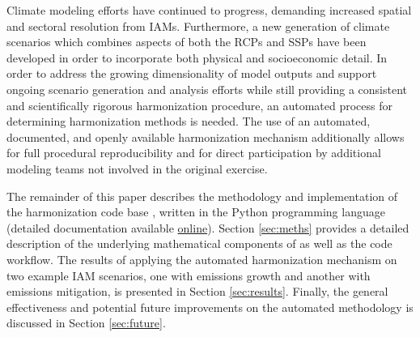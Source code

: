 Climate modeling efforts have continued to progress, demanding increased spatial
and sectoral resolution from IAMs. Furthermore, a new generation of climate
scenarios which combines aspects of both the RCPs and SSPs have been developed
in order to incorporate both physical and socioeconomic detail. In order to
address the growing dimensionality of model outputs and support ongoing scenario
generation and analysis efforts while still providing a consistent and
scientifically rigorous harmonization procedure, an automated process for
determining harmonization methods is needed. The use of an automated,
documented, and openly available harmonization mechanism additionally allows for
full procedural reproducibility and for direct participation by additional
modeling teams not involved in the original exercise.

The remainder of this paper describes the methodology and implementation of the
harmonization code base  \cite{matthew_gidden_2017_802832}, written in the Python
% 
% 
programming language (detailed documentation available
\href{http://mattgidden.com/aneris/}{online}). Section \ref{sec:meths} provides
a detailed description of the underlying mathematical components of
 as well as the code workflow. The results of applying the
automated harmonization mechanism on two example IAM scenarios, one with
emissions growth and another with emissions mitigation, is presented in Section
\ref{sec:results}. Finally, the general effectiveness and potential future
improvements on the automated methodology is discussed in Section
\ref{sec:future}.
